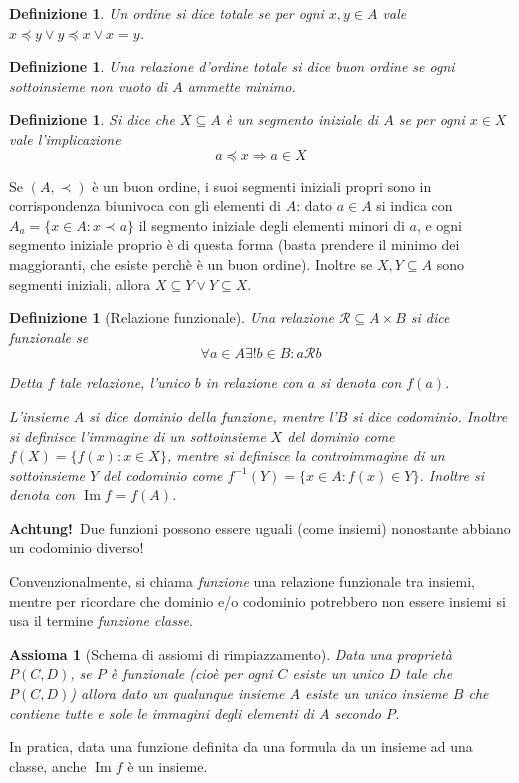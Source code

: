 \documentclass[a4paper,10pt,oneside]{article}
\DeclareMathOperator{\im}{Im}
\newcommand{\myname}[1]{\emph{#1}}
\newcommand{\rel}{\mathcal R}
\theoremstyle{plain}
\newtheorem{mydef}[mytheorem]{Definizione}
\newtheorem{myax}[mytheorem]{Assioma}
\theoremstyle{definition}
\theoremstyle{remark}
\begin{document}
\begin{mydef}
 Un ordine si dice totale se per ogni $x,y \in A$ vale $x \preceq y \lor y \preceq x \lor x=y$.
\end{mydef}
\begin{mydef}
 Una relazione d'ordine totale si dice \myname{buon ordine} se ogni sottoinsieme non vuoto di $A$ ammette minimo.  
\end{mydef}
\begin{mydef}
 Si dice che $X\subseteq A$ è un \myname{segmento iniziale} di $A$ se per ogni $x\in X$ vale l'implicazione \[a\preceq x \Rightarrow a \in X\]
\end{mydef}

Se $(A,\prec)$ è un buon ordine, i suoi segmenti iniziali propri sono in corrispondenza biunivoca con gli elementi di $A$: dato $a\in A$ si indica con $A_{a}=\{x\in A: x\prec a\}$ il segmento iniziale degli elementi minori di $a$, e ogni segmento iniziale proprio è di questa forma (basta prendere il minimo dei maggioranti, che esiste perchè è un buon ordine). Inoltre se $X,Y\subseteq A$ sono segmenti iniziali, allora $X\subseteq Y \vee Y\subseteq X$.

\begin{mydef}[Relazione funzionale]
 Una relazione $\rel \subseteq A\times B$ si dice funzionale se \[\forall a \in A \exists! b \in B: a\rel b\] 
 
 Detta $f$ tale relazione, l'unico $b$ in relazione con $a$ si denota con $f(a)$.
 
 L'insieme $A$ si dice \myname{dominio} della funzione, mentre l'$B$ si dice \myname{codominio}. Inoltre si definisce l'immagine di un sottoinsieme $X$ del dominio come $f(X)=\{f(x):x \in X\}$, mentre si definisce la controimmagine di un sottoinsieme $Y$ del codominio come $f^{-1}(Y)=\{x\in A: f(x)\in Y\}$. Inoltre si denota con $\im f = f(A)$.
\end{mydef}

\textbf{Achtung!}\texttrademark \ Due funzioni possono essere uguali (come insiemi) nonostante abbiano un codominio diverso!\vspace{6px}

Convenzionalmente, si chiama \myname{funzione} una relazione funzionale tra insiemi, mentre per ricordare che dominio e/o codominio potrebbero non essere insiemi si usa il termine \myname{funzione classe}.

\begin{myax}[Schema di assiomi di rimpiazzamento]
Data una proprietà $P(C,D)$, se $P$ è funzionale (cioè per ogni $C$ esiste un unico $D$ tale che $P(C,D)$) allora dato un qualunque insieme $A$ esiste un unico insieme $B$ che contiene tutte e sole le immagini degli elementi di $A$ secondo $P$.
\end{myax}
In pratica, data una funzione definita da una formula da un insieme ad una classe, anche $\im f$ è un insieme.
\end{document}
